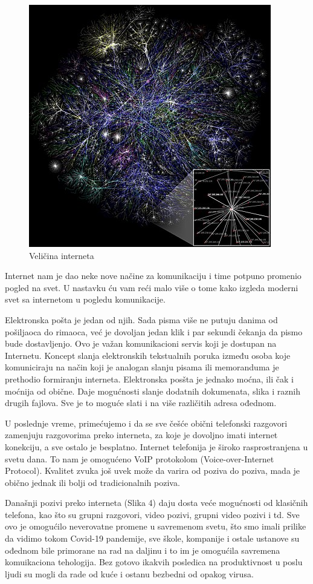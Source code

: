 \documentclass[12pt]{article}
\begin{document}
\begin{figure}
    \centering
    \includegraphics[scale=0.4]{internet.jpg}
    \caption{Veličina interneta}
\end{figure}
	

	Internet nam je dao neke nove načine za komunikaciju i time potpuno promenio pogled na svet. U nastavku ću vam reći malo više o tome kako izgleda moderni svet sa internetom u pogledu komunikacije.
	
	Elektronska pošta je jedan od njih. Sada pisma više ne putuju danima od pošiljaoca do rimaoca, već je dovoljan jedan klik i par sekundi čekanja da pismo bude dostavljenjo. Ovo je važan komunikacioni servis koji je dostupan na Internetu. Koncept slanja elektronskih tekstualnih poruka između osoba koje komuniciraju na način koji je analogan slanju pisama ili memoranduma je prethodio formiranju interneta. Elektronska posšta je jednako moćna, ili čak i moćnija od obične. Daje mogućnosti slanje dodatnih dokumenata, slika i raznih drugih fajlova. Sve je to moguće slati i na više različitih adresa ođednom.
	
	U poslednje vreme, primećujemo i da se sve češće obični telefonski razgovori zamenjuju razgovorima preko interneta, za koje je dovoljno imati internet konekciju, a sve ostalo je besplatno. Internet telefonija je široko rasprostranjena u svetu dana. To nam je omogućeno VoIP protokolom (Voice-over-Internet Protocol). Kvalitet zvuka još uvek može da varira od poziva do poziva, mada je obično jednak ili bolji od tradicionalnih poziva.
	
    Današnji pozivi preko interneta (Slika 4) daju dosta veće mogućnosti od klasičnih telefona, kao što su grupni razgovori, video pozivi, grupni video pozivi i td. Sve ovo je omogućilo neverovatne promene u savremenom svetu, što smo imali prilike da vidimo tokom Covid-19 pandemije, sve škole, kompanije i ostale ustanove su ođednom bile primorane na rad na daljinu i to im je omogućila savremena komuikaciona tehologija. Bez gotovo ikakvih posledica na produktivnost u poslu ljudi su mogli da rade od kuće i ostanu bezbedni od opakog virusa. 
\end{document}
